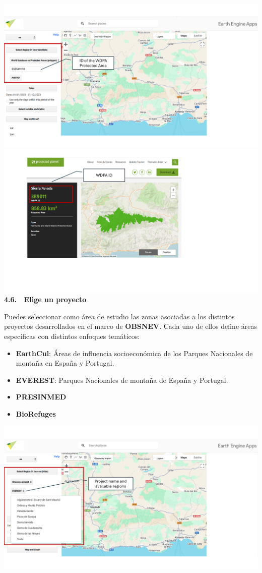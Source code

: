 \documentclass[
]{book}
\providecommand{\tightlist}{%
  \setlength{\itemsep}{0pt}\setlength{\parskip}{0pt}}
\begin{document}
\includegraphics{assets/WDPA.png}
\includegraphics{assets/WDPA2.png}
\textbf{4.6. 📁 Elige un proyecto}

Puedes seleccionar como área de estudio las zonas asociadas a los distintos proyectos desarrollados en el marco de \textbf{OBSNEV}. Cada uno de ellos define áreas específicas con distintos enfoques temáticos:

\begin{itemize}
\tightlist
\item
  \textbf{EarthCul}: Áreas de influencia socioeconómica de los Parques Nacionales de montaña en España y Portugal.\\
\item
  \textbf{EVEREST}: Parques Nacionales de montaña de España y Portugal.\\
\item
  \textbf{PRESINMED}\\
\item
  \textbf{BioRefuges}
\end{itemize}

\includegraphics{assets/PROJECTS.png}
\end{document}
